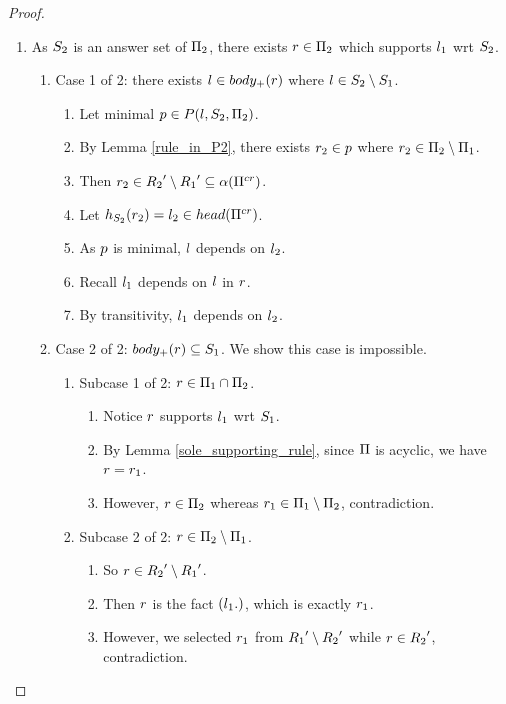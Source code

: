 \documentclass{paper}
\begin{document}
\begin{flushleft}
\begin{proof}
\begin{enumerate}
\item
As ${S}_{2}$ is an answer set of ${\Pi}_{2}$, there exists
$r\in {\Pi}_{2}$ which
supports ${l}_{1}$ wrt ${S}_{2}$.
\begin{enumerate}
\item
Case 1 of 2: there exists $l \in body_+(r)$ where
$l \in {S}_{2} \setminus {S}_{1}$.
\begin{enumerate}
\item
Let minimal $p \in P({l}, {{S}_{2}}, {{\Pi}_{2}})$.
\item
By Lemma \ref{rule_in_P2}, there exists ${r}_{2} \in p$
where ${r}_{2} \in {\Pi}_{2} \setminus {\Pi}_{1}$.
\item
Then ${r}_{2} \in {{R}_{2}}' \setminus {{R}_{1}}' \subseteq
\alpha(\Pi^{cr})$.
\item
Let $h_{{S}_{2}}({r}_{2}) = {{l}_{2}} \in head(\Pi^{cr})$.
\item
As $p$ is minimal, $l$ depends on ${l}_{2}$.
\item
Recall ${l}_{1}$ depends on $l$ in $r$.
\item
By transitivity, ${l}_{1}$ depends on ${l}_{2}$.
\end{enumerate}
\item
Case 2 of 2: $body_+(r) \subseteq {S}_{1}$.
We show this case is impossible.
\begin{enumerate}
\item
Subcase 1 of 2: $r \in {\Pi}_{1} \cap {\Pi}_{2}$.
\begin{enumerate}
\item
Notice $r$ supports ${l}_{1}$ wrt ${S}_{1}$.
\item
By Lemma \ref{sole_supporting_rule}, since $\Pi$ is acyclic,
we have $r = {r}_{1}$.
\item
However, $r \in {\Pi}_{2}$ whereas
${r}_{1} \in {\Pi}_{1} \setminus {\Pi}_{2}$, contradiction.
\end{enumerate}
\item
Subcase 2 of 2: $r \in {\Pi}_{2} \setminus {\Pi}_{1}$.
\begin{enumerate}
\item
So $r \in {{R}_{2}}' \setminus {{R}_{1}}'$.
\item
Then $r$ is the fact $({l}_{1}.)$,
which is exactly ${r}_{1}$.
\item
However, we selected ${r}_{1}$ from
${{R}_{1}}' \setminus {{R}_{2}}'$
while $r \in {{R}_{2}}'$, contradiction.
\end{enumerate}
\end{enumerate}
\end{enumerate}
\end{enumerate}


\end{proof}
\end{flushleft}
\end{document}
